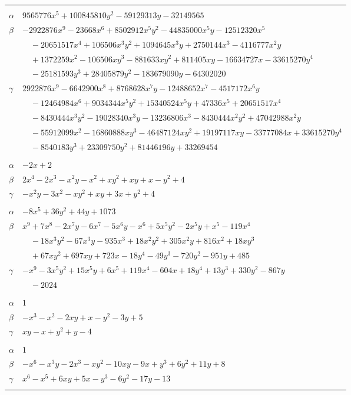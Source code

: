 \documentclass[11pt]{article}
\begin{document}
\begin{longtable}{@{}ll@{}}
\addlinespace[3pt]
\multicolumn{2}{@{}l}{$\{i,j\}=\{26,33\}$, $k_{ij}=2^{2}\cdot 5\cdot 17^{2}$}\\
$\alpha$ & $9565776x^{5}+100845810y^{2}-59129313y-32149565$\\
$\beta$ & $-2922876x^{9}-23668x^{6}+8502912x^{5}y^{2}-44835000x^{5}y-12512320x^{5}$\\
 & $\quad -20651517x^{4}+106506x^{3}y^{2}+1094645x^{3}y+2750144x^{3}-4116777x^{2}y$\\
 & $\quad +1372259x^{2}-106506xy^{3}-881633xy^{2}+811405xy-16634727x-33615270y^{4}$\\
 & $\quad -25181593y^{3}+28405879y^{2}-183679090y-64302020$\\
$\gamma$ & $2922876x^{9}-6642900x^{8}+8768628x^{7}y-12488652x^{7}-4517172x^{6}y$\\
 & $\quad -12464984x^{6}+9034344x^{5}y^{2}+15340524x^{5}y+47336x^{5}+20651517x^{4}$\\
 & $\quad -8430444x^{3}y^{2}-19028340x^{3}y-13236806x^{3}-8430444x^{2}y^{2}+47042988x^{2}y$\\
 & $\quad -55912099x^{2}-16860888xy^{3}-46487124xy^{2}+19197117xy-33777084x+33615270y^{4}$\\
 & $\quad -8540183y^{3}+23309750y^{2}+81446196y+33269454$\\
\addlinespace[3pt]
\multicolumn{2}{@{}l}{$\{i,j\}=\{27,31\}$, $k_{ij}=2^{3}\cdot 3$}\\
$\alpha$ & $-2x+2$\\
$\beta$ & $2x^{4}-2x^{3}-x^{2}y-x^{2}+xy^{2}+xy+x-y^{2}+4$\\
$\gamma$ & $-x^{2}y-3x^{2}-xy^{2}+xy+3x+y^{2}+4$\\
\addlinespace[3pt]
\multicolumn{2}{@{}l}{$\{i,j\}=\{28,31\}$, $k_{ij}=3^{6}$}\\
$\alpha$ & $-8x^{5}+36y^{2}+44y+1073$\\
$\beta$ & $x^{9}+7x^{8}-2x^{7}y-6x^{7}-5x^{6}y-x^{6}+5x^{5}y^{2}-2x^{5}y+x^{5}-119x^{4}$\\
 & $\quad -18x^{3}y^{2}-67x^{3}y-935x^{3}+18x^{2}y^{2}+305x^{2}y+816x^{2}+18xy^{3}$\\
 & $\quad +67xy^{2}+697xy+723x-18y^{4}-49y^{3}-720y^{2}-951y+485$\\
$\gamma$ & $-x^{9}-3x^{5}y^{2}+15x^{5}y+6x^{5}+119x^{4}-604x+18y^{4}+13y^{3}+330y^{2}-867y$\\
 & $\quad -2024$\\
\addlinespace[3pt]
\multicolumn{2}{@{}l}{$\{i,j\}=\{29,33\}$, $k_{ij}=3^{2}$}\\
$\alpha$ & $1$\\
$\beta$ & $-x^{3}-x^{2}-2xy+x-y^{2}-3y+5$\\
$\gamma$ & $xy-x+y^{2}+y-4$\\
\addlinespace[3pt]
\multicolumn{2}{@{}l}{$\{i,j\}=\{30,32\}$, $k_{ij}=1$}\\
$\alpha$ & $1$\\
$\beta$ & $-x^{6}-x^{3}y-2x^{3}-xy^{2}-10xy-9x+y^{3}+6y^{2}+11y+8$\\
$\gamma$ & $x^{6}-x^{5}+6xy+5x-y^{3}-6y^{2}-17y-13$\\
\addlinespace[3pt]
\end{longtable}
\endgroup
\end{document}
